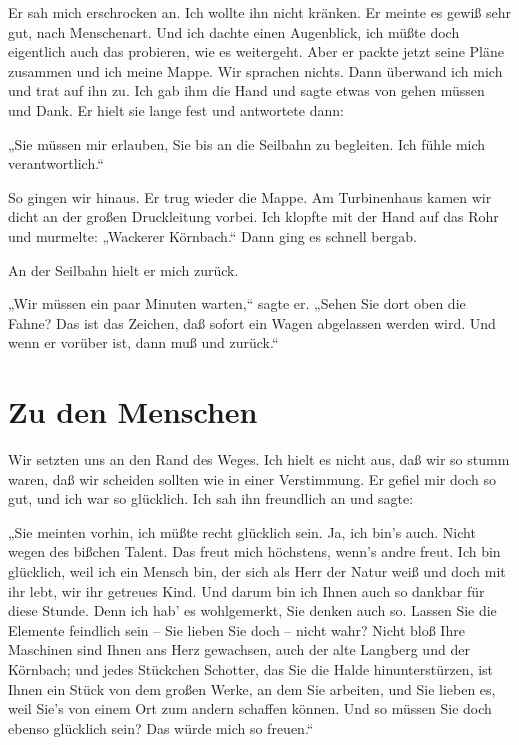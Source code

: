 Er sah mich erschrocken an. Ich wollte ihn nicht kränken. Er meinte
es gewiß sehr gut, nach Menschenart. Und ich dachte einen
Augenblick, ich müßte doch eigentlich auch das probieren, wie es
weitergeht. Aber er packte jetzt seine Pläne zusammen und ich meine
Mappe. Wir sprachen nichts. Dann überwand ich mich und trat auf ihn
zu. Ich gab ihm die Hand und sagte etwas von gehen müssen und Dank.
Er hielt sie lange fest und antwortete dann:

„Sie müssen mir erlauben, Sie bis an die Seilbahn zu begleiten. Ich
fühle mich verantwortlich.“

So gingen wir hinaus. Er trug wieder die Mappe. Am Turbinenhaus
kamen wir dicht an der großen Druckleitung vorbei. Ich klopfte mit
der Hand auf das Rohr und murmelte: „Wackerer Körnbach.“ Dann ging
es schnell bergab.

An der Seilbahn hielt er mich zurück.

„Wir müssen ein paar Minuten warten,“ sagte er. „Sehen Sie dort
oben die Fahne? Das ist das Zeichen, daß sofort ein Wagen
abgelassen werden wird. Und wenn er vorüber ist, dann muß und
zurück.“

\section{Zu den Menschen \ausaspirastagebuch}


Wir setzten uns an den Rand des Weges. Ich hielt es nicht aus, daß
wir so stumm waren, daß wir scheiden sollten wie in einer
Verstimmung. Er gefiel mir doch so gut, und ich war so glücklich.
Ich sah ihn freundlich an und sagte:

„Sie meinten vorhin, ich müßte recht glücklich sein. Ja, ich bin's
auch. Nicht wegen des bißchen Talent. Das freut mich höchstens,
wenn's andre freut. Ich bin glücklich, weil ich ein Mensch bin, der
sich als Herr der Natur weiß und doch mit ihr lebt, wir ihr
getreues Kind. Und darum bin ich Ihnen auch so dankbar für diese
Stunde. Denn ich hab' es wohlgemerkt, Sie denken auch so. Lassen
Sie die Elemente feindlich sein – Sie lieben Sie doch – nicht wahr?
Nicht bloß Ihre Maschinen sind Ihnen ans Herz gewachsen, auch der
alte Langberg und der Körnbach; und jedes Stückchen Schotter, das
Sie die Halde hinunterstürzen, ist Ihnen ein Stück von dem großen
Werke, an dem Sie arbeiten, und Sie lieben es, weil Sie's von einem
Ort zum andern schaffen können. Und so müssen Sie doch ebenso
glücklich sein? Das würde mich so freuen.“

